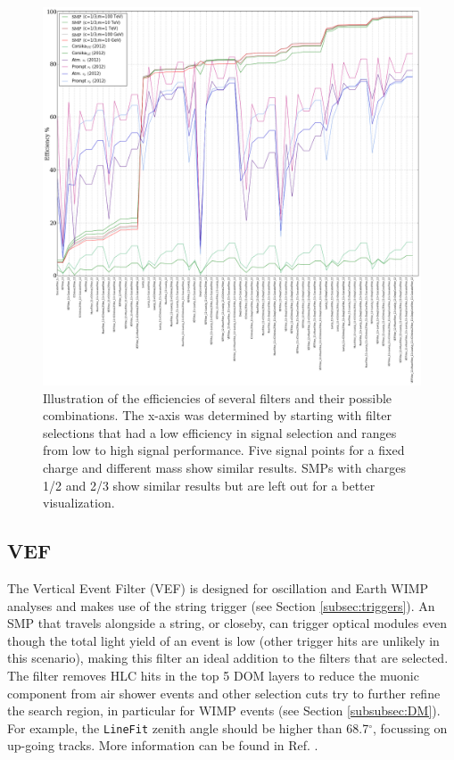 \begin{figure}
\centering
\includegraphics[width=\textwidth]{chapter8/img/FilterRate_better.png}
\caption{Illustration of the efficiencies of several filters and their possible combinations. The x-axis was determined by starting with filter selections that had a low efficiency in signal selection and ranges from low to high signal performance. Five signal points for a fixed charge and different mass show similar results. SMPs with charges 1/2 and 2/3 show similar results but are left out for a better visualization.}
\label{fig:filterrate}
\end{figure}

\subsection{VEF}
The Vertical Event Filter (VEF) is designed for oscillation and Earth WIMP analyses and makes use of the string trigger (see Section \ref{subsec:triggers}). An SMP that travels alongside a string, or closeby, can trigger optical modules even though the total light yield of an event is low (other trigger hits are unlikely in this scenario), making this filter an ideal addition to the filters that are selected. The filter removes HLC hits in the top 5 DOM layers to reduce the muonic component from air shower events and other selection cuts try to further refine the search region, in particular for WIMP events (see Section \ref{subsubsec:DM}). For example, the \texttt{LineFit} zenith angle should be higher than 68.7$^\circ$, focussing on up-going tracks. More information can be found in Ref. \cite{VEF2012}.

